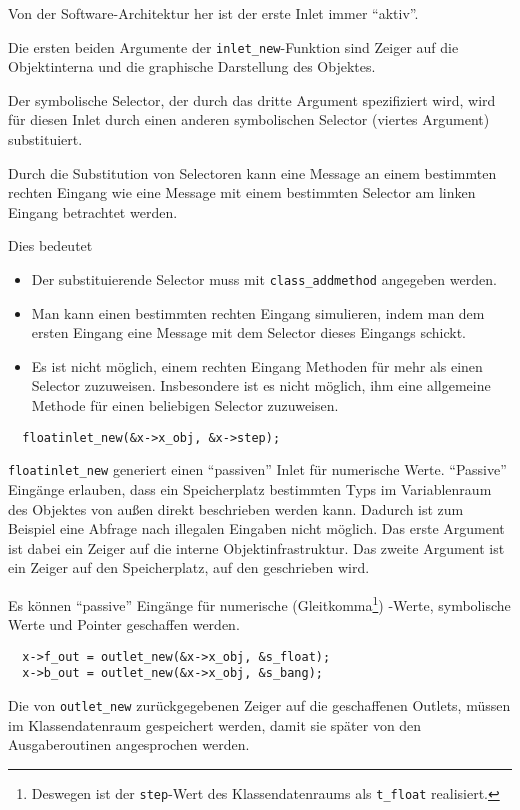 \documentclass[12pt, a4paper,austrian, titlepage]{article}
\begin{document}
Von der Software-Architektur her ist der erste Inlet immer ``aktiv''.

Die ersten beiden Argumente der \verb+inlet_new+-Funktion
sind Zeiger auf die Objektinterna und die graphische Darstellung des Objektes.

Der symbolische Selector, der durch das dritte Argument spezifiziert wird,
wird für diesen Inlet durch einen anderen symbolischen Selector (viertes Argument)
substituiert.

Durch die Substitution von Selectoren kann eine Message
an einem bestimmten rechten Eingang wie eine Message mit einem bestimmten Selector
am linken Eingang betrachtet werden.

Dies bedeutet
\begin{itemize}
\item Der substituierende Selector muss mit \verb+class_addmethod+ angegeben werden.
\item Man kann einen bestimmten rechten Eingang simulieren,
indem man dem ersten Eingang eine Message mit dem Selector dieses Eingangs schickt.
\item Es ist nicht möglich, einem rechten Eingang Methoden für mehr als einen Selector
zuzuweisen. Insbesondere ist es nicht möglich, ihm eine allgemeine Methode
für einen beliebigen Selector zuzuweisen.
\end{itemize}

\begin{verbatim}
  floatinlet_new(&x->x_obj, &x->step);
\end{verbatim}
\verb+floatinlet_new+ generiert einen ``passiven'' Inlet für numerische Werte.
``Passive'' Eingänge erlauben, dass ein Speicherplatz bestimmten Typs im
Variablenraum des Objektes von außen direkt beschrieben werden kann.
Dadurch ist zum Beispiel eine Abfrage nach illegalen Eingaben nicht möglich.
Das erste Argument ist dabei ein Zeiger auf die interne Objektinfrastruktur.
Das zweite Argument ist ein Zeiger auf den Speicherplatz, auf den geschrieben wird.

Es können ``passive'' Eingänge für numerische (Gleitkomma\footnote{
Deswegen ist der {\tt step}-Wert des Klassendatenraums als {\tt t\_float} realisiert.})
-Werte, symbolische Werte und Pointer geschaffen werden.

\begin{verbatim}
  x->f_out = outlet_new(&x->x_obj, &s_float);
  x->b_out = outlet_new(&x->x_obj, &s_bang);
\end{verbatim}

Die von \verb+outlet_new+ zurückgegebenen Zeiger auf die geschaffenen Outlets,
müssen im Klassendatenraum gespeichert werden,
damit sie später von den Ausgaberoutinen angesprochen werden.
\end{document}
